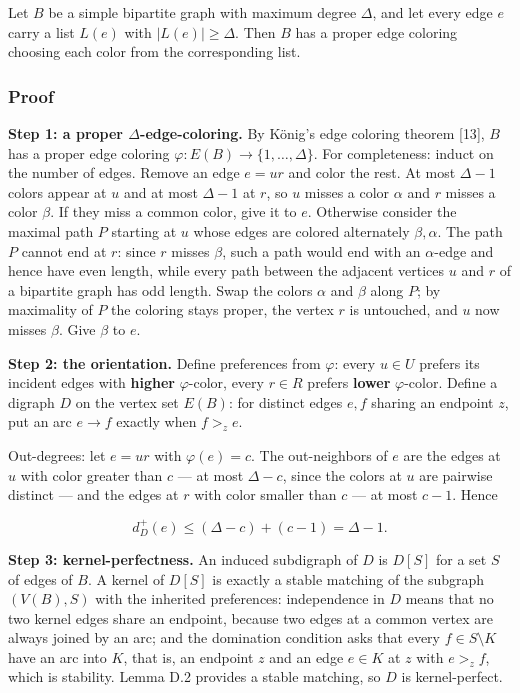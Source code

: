 \documentclass[
  11pt,
]{article}
\begin{document}
Let \(B\) be a simple bipartite graph with maximum degree \(\Delta\),
and let every edge \(e\) carry a list \(L(e)\) with \(|L(e)|\ge\Delta\).
Then \(B\) has a proper edge coloring choosing each color from the
corresponding list.

\subsubsection{Proof}\label{proof-9}

\textbf{Step 1: a proper \(\Delta\)-edge-coloring.} By König's edge
coloring theorem {[}13{]}, \(B\) has a proper edge coloring
\(\varphi:E(B)\to\{1,\ldots,\Delta\}\). For completeness: induct on the
number of edges. Remove an edge \(e=ur\) and color the rest. At most
\(\Delta-1\) colors appear at \(u\) and at most \(\Delta-1\) at \(r\),
so \(u\) misses a color \(\alpha\) and \(r\) misses a color \(\beta\).
If they miss a common color, give it to \(e\). Otherwise consider the
maximal path \(P\) starting at \(u\) whose edges are colored alternately
\(\beta,\alpha\). The path \(P\) cannot end at \(r\): since \(r\) misses
\(\beta\), such a path would end with an \(\alpha\)-edge and hence have
even length, while every path between the adjacent vertices \(u\) and
\(r\) of a bipartite graph has odd length. Swap the colors \(\alpha\)
and \(\beta\) along \(P\); by maximality of \(P\) the coloring stays
proper, the vertex \(r\) is untouched, and \(u\) now misses \(\beta\).
Give \(\beta\) to \(e\).

\textbf{Step 2: the orientation.} Define preferences from \(\varphi\):
every \(u\in U\) prefers its incident edges with \textbf{higher}
\(\varphi\)-color, every \(r\in R\) prefers \textbf{lower}
\(\varphi\)-color. Define a digraph \(D\) on the vertex set \(E(B)\):
for distinct edges \(e,f\) sharing an endpoint \(z\), put an arc
\(e\to f\) exactly when \(f>_ze\).

Out-degrees: let \(e=ur\) with \(\varphi(e)=c\). The out-neighbors of
\(e\) are the edges at \(u\) with color greater than \(c\) --- at most
\(\Delta-c\), since the colors at \(u\) are pairwise distinct --- and
the edges at \(r\) with color smaller than \(c\) --- at most \(c-1\).
Hence

\[
d^+_D(e)\le(\Delta-c)+(c-1)=\Delta-1.
\]

\textbf{Step 3: kernel-perfectness.} An induced subdigraph of \(D\) is
\(D[S]\) for a set \(S\) of edges of \(B\). A kernel of \(D[S]\) is
exactly a stable matching of the subgraph \((V(B),S)\) with the
inherited preferences: independence in \(D\) means that no two kernel
edges share an endpoint, because two edges at a common vertex are always
joined by an arc; and the domination condition asks that every
\(f\in S\setminus K\) have an arc into \(K\), that is, an endpoint \(z\)
and an edge \(e\in K\) at \(z\) with \(e>_zf\), which is stability.
Lemma D.2 provides a stable matching, so \(D\) is kernel-perfect.
\end{document}
